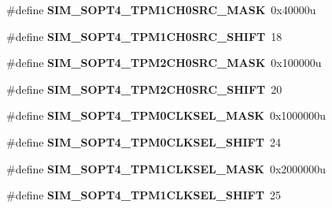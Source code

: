 \begin{DoxyCompactItemize}
\mbox{\label{group___s_i_m___register___masks_ga9897da591b25b25a121a2321c5515923}} 
\#define {\bfseries S\+I\+M\+\_\+\+S\+O\+P\+T4\+\_\+\+T\+P\+M1\+C\+H0\+S\+R\+C\+\_\+\+M\+A\+SK}~0x40000u
\item 
\mbox{\label{group___s_i_m___register___masks_ga79b1e63028e073fbe12351561f1b7645}} 
\#define {\bfseries S\+I\+M\+\_\+\+S\+O\+P\+T4\+\_\+\+T\+P\+M1\+C\+H0\+S\+R\+C\+\_\+\+S\+H\+I\+FT}~18
\item 
\mbox{\label{group___s_i_m___register___masks_ga871c6061ab30b4ad99b919e35e86c081}} 
\#define {\bfseries S\+I\+M\+\_\+\+S\+O\+P\+T4\+\_\+\+T\+P\+M2\+C\+H0\+S\+R\+C\+\_\+\+M\+A\+SK}~0x100000u
\item 
\mbox{\label{group___s_i_m___register___masks_ga85ccc239517b7633b2c0a164b8d5cbf3}} 
\#define {\bfseries S\+I\+M\+\_\+\+S\+O\+P\+T4\+\_\+\+T\+P\+M2\+C\+H0\+S\+R\+C\+\_\+\+S\+H\+I\+FT}~20
\item 
\mbox{\label{group___s_i_m___register___masks_gae889ccb89e5c139f002b6a62d21628a9}} 
\#define {\bfseries S\+I\+M\+\_\+\+S\+O\+P\+T4\+\_\+\+T\+P\+M0\+C\+L\+K\+S\+E\+L\+\_\+\+M\+A\+SK}~0x1000000u
\item 
\mbox{\label{group___s_i_m___register___masks_ga608eeddec48cf22911d5f5a1ea52c261}} 
\#define {\bfseries S\+I\+M\+\_\+\+S\+O\+P\+T4\+\_\+\+T\+P\+M0\+C\+L\+K\+S\+E\+L\+\_\+\+S\+H\+I\+FT}~24
\item 
\mbox{\label{group___s_i_m___register___masks_ga049c795a05cfcabb4865bd94e9960d1c}} 
\#define {\bfseries S\+I\+M\+\_\+\+S\+O\+P\+T4\+\_\+\+T\+P\+M1\+C\+L\+K\+S\+E\+L\+\_\+\+M\+A\+SK}~0x2000000u
\item 
\mbox{\label{group___s_i_m___register___masks_gae2f48392a848aa2b9dd0f4f117682ff1}} 
\#define {\bfseries S\+I\+M\+\_\+\+S\+O\+P\+T4\+\_\+\+T\+P\+M1\+C\+L\+K\+S\+E\+L\+\_\+\+S\+H\+I\+FT}~25
\item 
\mbox{\label{group___s_i_m___register___masks_gad5a902a0614ee968bf5f4e8b4d619631}} 

\end{DoxyCompactItemize}
